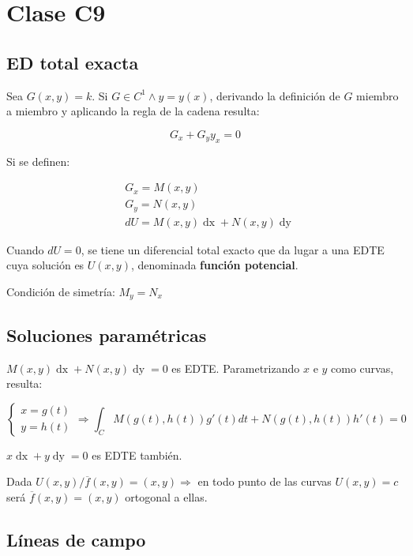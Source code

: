 \documentclass{article}
\begin{document}
\section{Clase C9}

\subsection{ED total exacta}

Sea $G(x,y) = k$. Si $G \in C^1 \wedge y = y(x)$, derivando la definición de $G$ miembro a miembro y aplicando la regla de la cadena resulta:

\begin{equation}
G_x + G_y y_x = 0
\end{equation}

Si se definen:

\begin{align}
& G_x = M(x,y) \\
& G_y = N(x,y) \\
& dU = M(x,y) \mathop{dx} + N(x,y) \mathop{dy}
\end{align}

Cuando $dU = 0$, se tiene un diferencial total exacto que da lugar a una EDTE cuya solución es $U(x,y)$, denominada \textbf{función potencial}.

Condición de simetría: $M_y = N_x$

\subsection{Soluciones paramétricas}

$M(x,y) \mathop{dx} + N(x,y) \mathop{dy} = 0$ es EDTE. Parametrizando $x$ e $y$ como curvas, resulta:

\begin{equation}
\left\{
\begin{array}{ll}
x = g(t) \\
y = h(t)
\end{array}
\right. \Rightarrow \int_C M(g(t), h(t)) g'(t) dt + N(g(t), h(t)) h'(t) = 0
\end{equation}

$x \mathop{dx} + y \mathop{dy} = 0$ es EDTE también.

Dada $U(x,y) / \overline{f}(x,y) = (x,y) \Rightarrow$ en todo punto de las curvas $U(x,y) = c$ será $\overline{f}(x,y) = (x,y)$ ortogonal a ellas.

\subsection{Líneas de campo}
\end{document}
